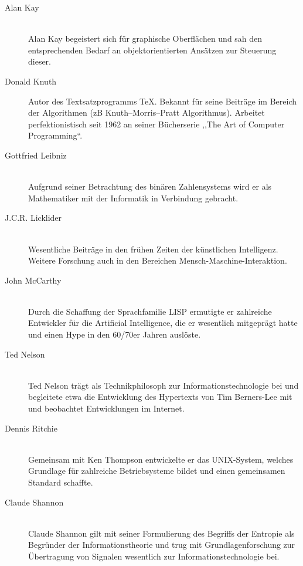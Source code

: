 \begin{description}
  \item[Alan Kay ] \hfill{} \\
    Alan Kay begeistert sich für graphische Oberflächen und sah den entsprechenden Bedarf an objektorientierten Ansätzen zur Steuerung dieser.

  \item[Donald Knuth ] \hfill{}
    Autor des Textsatzprogramms \TeX. Bekannt für seine Beiträge im Bereich der Algorithmen (zB Knuth–Morris–Pratt Algorithmus). Arbeitet perfektionistisch seit 1962 an seiner Bücherserie ,,The Art of Computer Programming``.

  \item[Gottfried Leibniz ] \hfill{} \\
    Aufgrund seiner Betrachtung des binären Zahlensystems wird er als Mathematiker mit der Informatik in Verbindung gebracht.

  \item[J.C.R. Licklider ] \hfill{} \\
    Wesentliche Beiträge in den frühen Zeiten der künstlichen Intelligenz.
    Weitere Forschung auch in den Bereichen Mensch-Maschine-Interaktion.

  \item[John McCarthy ] \hfill{} \\
    Durch die Schaffung der Sprachfamilie LISP ermutigte er zahlreiche Entwickler für die Artificial Intelligence, die er wesentlich mitgeprägt hatte und einen Hype in den 60/70er Jahren auslöste.

  \item[Ted Nelson ] \hfill{} \\
    Ted Nelson trägt als Technikphilosoph zur Informationstechnologie bei und begleitete etwa die Entwicklung des Hypertexts von Tim Berners-Lee mit und beobachtet Entwicklungen im Internet.

  \item[Dennis Ritchie ] \hfill{} \\
   Gemeinsam mit Ken Thompson entwickelte er das UNIX-System, welches Grundlage für zahlreiche Betriebsysteme bildet und einen gemeinsamen Standard schaffte.

  \item[Claude Shannon ] \hfill{} \\
   Claude Shannon gilt mit seiner Formulierung des Begriffs der Entropie als Begründer der Informationstheorie und trug mit Grundlagenforschung zur Übertragung von Signalen wesentlich zur Informationstechnologie bei.


\end{description}
